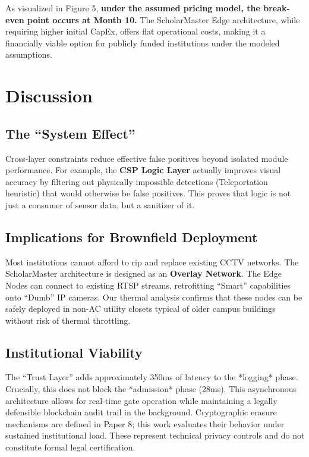 \documentclass[conference]{IEEEtran}
\begin{document}
As visualized in Figure 5, \textbf{under the assumed pricing model, the break-even point occurs at Month 10.} The ScholarMaster Edge architecture, while requiring higher initial CapEx, offers flat operational costs, making it a financially viable option for publicly funded institutions under the modeled assumptions.

\section{Discussion}

\subsection{The ``System Effect''}
Cross-layer constraints reduce effective false positives beyond isolated module performance. For example, the \textbf{CSP Logic Layer} \cite{p4} actually improves visual accuracy by filtering out physically impossible detections (Teleportation heuristic) that would otherwise be false positives. This proves that logic is not just a consumer of sensor data, but a sanitizer of it.

\subsection{Implications for Brownfield Deployment}
Most institutions cannot afford to rip and replace existing CCTV networks. The ScholarMaster architecture is designed as an \textbf{Overlay Network}. The Edge Nodes can connect to existing RTSP streams, retrofitting ``Smart'' capabilities onto ``Dumb'' IP cameras. Our thermal analysis confirms that these nodes can be safely deployed in non-AC utility closets typical of older campus buildings without risk of thermal throttling.

\subsection{Institutional Viability}
The ``Trust Layer'' \cite{p8} adds approximately 350ms of latency to the *logging* phase. Crucially, this does not block the *admission* phase (28ms). This asynchronous architecture allows for real-time gate operation while maintaining a legally defensible blockchain audit trail in the background. Cryptographic erasure mechanisms are defined in Paper 8; this work evaluates their behavior under sustained institutional load. These represent technical privacy controls and do not constitute formal legal certification.
\end{document}
